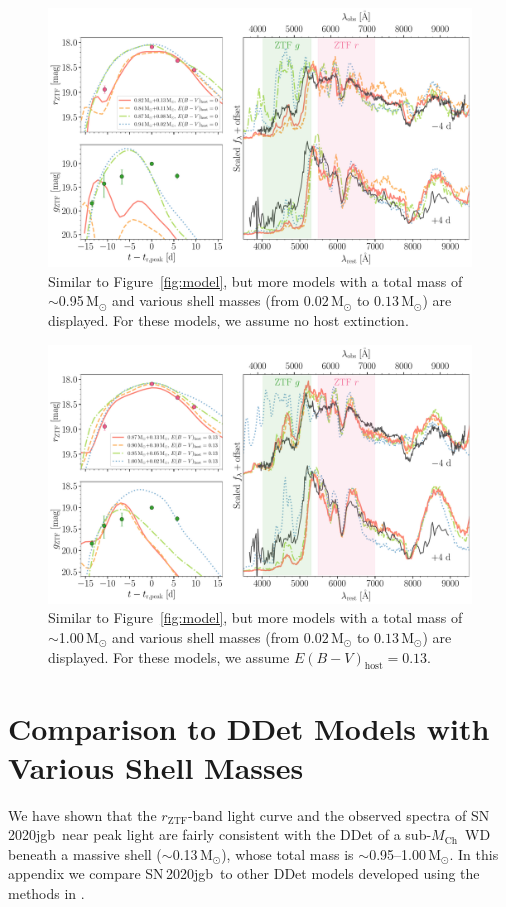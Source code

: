 \documentclass[twocolumn]{aastex631}
\newcommand{\sn}{SN\,2020jgb}
\newcommand{\Mch}{$M_\mathrm{Ch}$}
\newcommand{\Msun}{\mathrm{M_\odot}}
\begin{document}
\appendix
\begin{figure}
    \centering
    \includegraphics[width=\textwidth]{model_0_95.pdf}
    \caption{Similar to Figure~\ref{fig:model}, but more models with a total mass of $\sim$0.95\,$\Msun$ and various shell masses (from $0.02\,\Msun$ to $0.13\,\Msun$) are displayed. For these models, we assume no host extinction.}
    \label{fig:model_0_95}
\end{figure}

\begin{figure}
    \centering
    \includegraphics[width=\textwidth]{model_1_0.pdf}
    \caption{Similar to Figure~\ref{fig:model}, but more models with a total mass of $\sim$1.00\,$\Msun$ and various shell masses (from $0.02\,\Msun$ to $0.13\,\Msun$) are displayed. For these models, we assume $E(B-V)_\mathrm{host}=0.13$.}
    \label{fig:model_1_0}
\end{figure}

\section{Comparison to DDet Models with Various Shell Masses}\label{app1}
We have shown that the $r_\mathrm{ZTF}$-band light curve and the observed spectra of \sn\ near peak light are fairly consistent with the DDet of a sub-\Mch\ WD beneath a massive shell ($\sim$0.13\,$\Msun$), whose total mass is $\sim$0.95--1.00\,$\Msun$. In this appendix we compare \sn\ to other DDet models developed using the methods in \citet{polin_observational_2019}. 
\end{document}
